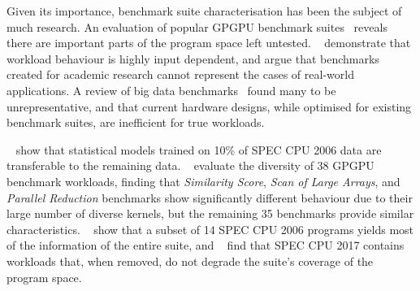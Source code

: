 Given its importance, benchmark suite characterisation has been the subject of much research. An evaluation of popular GPGPU benchmark suites~\cite{Ryoo2015} reveals there are important parts of the program space left untested.
\citeauthor{Xiong2013}~\cite{Xiong2013} demonstrate that workload behaviour is highly input dependent, and argue that benchmarks created for academic research cannot represent the cases of real-world applications.
A review of big data benchmarks~\cite{Ferdman2012} found many to be unrepresentative, and that current hardware designs, while optimised for existing benchmark suites, are inefficient for true workloads.

\citeauthor{Ould-Ahmed-Vall2008}~\cite{Ould-Ahmed-Vall2008} show that statistical models trained on 10\% of SPEC CPU 2006 data are transferable to the remaining data.
\citeauthor{Goswami2010}~\cite{Goswami2010} evaluate the diversity of 38 GPGPU benchmark workloads, finding that \emph{Similarity Score}, \emph{Scan of Large Arrays}, and \emph{Parallel Reduction} benchmarks show significantly different behaviour due to their large number of diverse kernels, but the remaining 35 benchmarks provide similar characteristics.
\citeauthor{Phansalkar2007}~\cite{Phansalkar2007} show that a subset of 14 SPEC CPU 2006 programs yields most of the information of the entire suite, and
\citeauthor{Draft2018}~\cite{Draft2018} find that SPEC CPU 2017 contains workloads that, when removed, do not degrade the suite's coverage of the program space.

